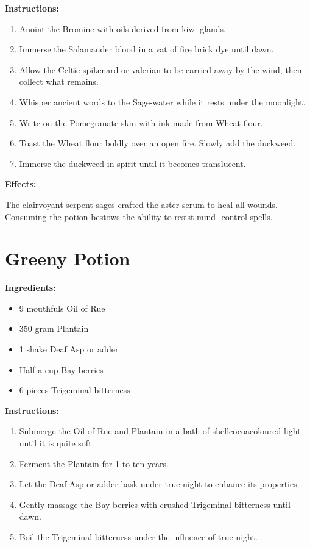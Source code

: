 \documentclass{article}
\begin{document}
\textbf{Instructions:}

\begin{enumerate}
  \item Anoint the Bromine with oils derived from kiwi glands.
  \item Immerse the Salamander blood in a vat of fire brick dye until dawn.
  \item Allow the Celtic spikenard or valerian to be carried away by the wind, then collect what remains.
  \item Whisper ancient words to the Sage-water while it rests under the moonlight.
  \item Write on the Pomegranate skin with ink made from Wheat flour.
  \item Toast the Wheat flour boldly over an open fire. Slowly add the duckweed.
  \item Immerse the duckweed in spirit until it becomes translucent.
\end{enumerate}

\textbf{Effects:}

The clairvoyant serpent sages crafted the aster serum to heal all wounds. Consuming the potion bestows the ability to resist mind- control spells.

\newpage
\section*{Greeny Potion}

\textbf{Ingredients:}

\begin{itemize}
  \item 9 mouthfuls Oil of Rue
  \item 350 gram Plantain
  \item 1 shake Deaf Asp or adder
  \item Half a cup Bay berries
  \item 6 pieces Trigeminal bitterness
\end{itemize}

\textbf{Instructions:}

\begin{enumerate}
  \item Submerge the Oil of Rue and Plantain in a bath of shellcocoacoloured light until it is quite soft.
  \item Ferment the Plantain for 1 to ten years.
  \item Let the Deaf Asp or adder bask under true night to enhance its properties.
  \item Gently massage the Bay berries with crushed Trigeminal bitterness until dawn.
  \item Boil the Trigeminal bitterness under the influence of true night.
\end{enumerate}
\end{document}
